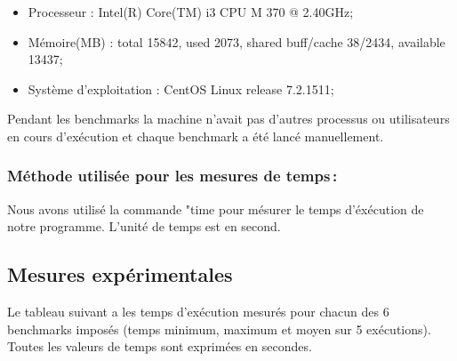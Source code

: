 \documentclass{article}
\begin{document}
        \vspace*{\baselineskip}
        
        \begin{itemize}
            \item Processeur : Intel(R) Core(TM) i3 CPU M 370  @ 2.40GHz;
            \item Mémoire(MB) : total 15842, used 2073, shared buff/cache 38/2434, available 13437;
            \item Système d'exploitation : CentOS Linux release 7.2.1511;
        \end{itemize}
        
        \vspace*{\baselineskip}
        
        Pendant les benchmarks la machine n'avait pas d'autres processus ou utilisateurs en cours d'exécution et chaque benchmark a été lancé manuellement.
    
    \subsubsection{Méthode utilisée pour les mesures de temps\,: } 
    Nous avons utilisé la commande "time pour mésurer le temps d'éxécution de notre programme. L'unité de temps est en second.

  \subsection{Mesures expérimentales}
    Le tableau suivant a les temps d'exécution mesurés pour chacun des 6 benchmarks imposés
    (temps minimum, maximum et moyen sur 5 exécutions). Toutes les valeurs de temps sont exprimées en secondes.
    
\end{document}
